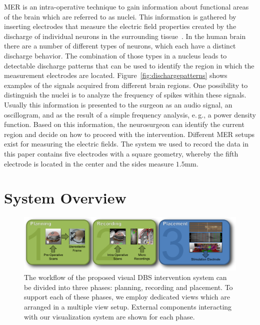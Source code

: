 \documentclass{vgtc}                          %
\begin{document}
MER is an intra-operative technique to gain information about functional areas of the brain which are referred to as nuclei. This information is gathered by inserting electrodes that measure the electric field properties created by the discharge of individual neurons in the surrounding tissue~\cite{McIntyre2006}. In the human brain there are a number of different types of neurons, which each have a distinct discharge behavior. The combination of those types in a nucleus leads to detectable discharge patterns that can be used to identify the region in which the measurement electrodes are located. Figure~\ref{fig:dischargepatterns} shows examples of the signals acquired from different brain regions. One possibility to distinguish the nuclei is to analyze the frequency of spikes within these signals. Usually this information is presented to the surgeon as an audio signal, an oscillogram, and as the result of a simple frequency analysis, e.\,g., a power density function. Based on this information, the neurosurgeon can identify the current region and decide on how to proceed with the intervention. Different MER setups exist for measuring the electric fields. The system we used to record the data in this paper contains five electrodes with a square geometry, whereby the fifth electrode is located in the center and the sides measure $1.5$mm.

%
%

\section{System Overview}\label{sec:overview}
\begin{figure}[t]
    \centering
    \includegraphics[width=0.9\linewidth]{figures/workflow}
    \caption{The workflow of the proposed visual DBS intervention system can be divided into three phases: planning, recording and placement. To support each of these phases, we employ dedicated views which are arranged in a multiple view setup. External components interacting with our visualization system are shown for each phase.}
    \label{fig:workflow}
\end{figure}
\end{document}
